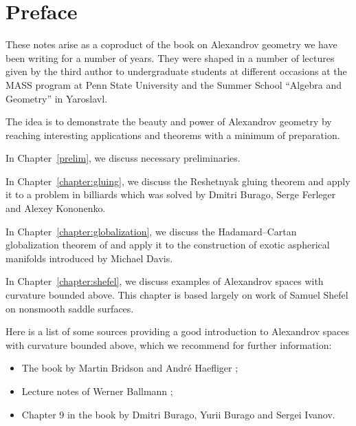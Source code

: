 \mainmatter

\chapter*{Preface}

These notes arise as a coproduct of the book on Alexandrov geometry
we have been writing for  a number of years.
They were shaped in a number of lectures given by the third author
to undergraduate students 
at different  occasions at the
MASS program at Penn State University
and the Summer School ``Algebra and Geometry'' in Yaroslavl.

The idea is to demonstrate the beauty and power of Alexandrov geometry by reaching interesting applications 
and theorems 
 with a minimum of preparation.

\medskip 

In Chapter~\ref{prelim}, we discuss necessary preliminaries.

In Chapter~\ref{chapter:gluing}, we discuss the Reshetnyak gluing theorem and apply it to a problem in billiards which was solved by Dmitri Burago, Serge Ferleger and Alexey Kononenko.

In Chapter~\ref{chapter:globalization}, we discuss the Hadamard--Cartan globalization theorem of  and apply it to the construction of exotic aspherical manifolds introduced by Michael Davis.

In Chapter~\ref{chapter:shefel}, we discuss examples of Alexandrov spaces with curvature bounded above.
This chapter is based largely on work of Samuel Shefel on nonsmooth saddle surfaces.

\medskip

Here is a list of some sources providing a good introduction to Alexandrov spaces with curvature bounded above, which we recommend for further information: 

\begin{itemize}
\item The book by Martin Bridson and Andr\'e Haefliger \cite{BH};
\item Lecture notes of Werner Ballmann \cite{ballmann:lectures};
\item Chapter 9 in the book \cite{BBI} by Dmitri Burago, Yurii Burago and Sergei Ivanov.
\end{itemize}

